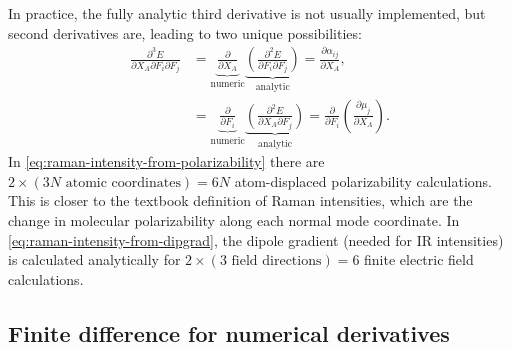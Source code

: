 \documentclass[%
class = book,%
crop = false,%
float = true,%
multi = true,%
preview = false,%
]{standalone}
\let\cite\autocite
\begin{document}
In practice, the fully analytic third derivative is not usually implemented, but second derivatives are, leading to two unique possibilities:
\begin{align}
  \label{eq:raman-intensity-from-polarizability}
  \frac{\partial^{3} E}{\partial X_{A} \partial F_{i} \partial F_{j}} &= \underbrace{\frac{\partial}{\partial X_{A}}}_{\text{numeric}} \underbrace{\left(\frac{\partial^{2} E}{\partial F_{i} \partial F_{j}}\right)}_{\text{analytic}} = \frac{\partial \alpha_{ij}}{\partial X_{A}}, \\
  \label{eq:raman-intensity-from-dipgrad}
  &= \underbrace{\frac{\partial}{\partial F_{i}}}_{\text{numeric}} \underbrace{\left(\frac{\partial^{2} E}{\partial X_{A} \partial F_{j}}\right)}_{\text{analytic}} = \frac{\partial}{\partial F_{i}} \left( \frac{\partial \mu_{j}}{\partial X_{A}} \right).
\end{align}
In \eqref{eq:raman-intensity-from-polarizability} there are \(2 \times (3N \,\,\text{atomic coordinates}) = 6N\) atom-displaced polarizability calculations. This is closer to the textbook definition of Raman intensities, which are the change in molecular polarizability along each normal mode coordinate\cite{TODO}. In \eqref{eq:raman-intensity-from-dipgrad}, the dipole gradient (needed for IR intensities) is calculated analytically for \(2 \times (3 \,\,\text{field directions}) = 6\) finite electric field calculations.

\subsection{Finite difference for numerical derivatives}
\label{ssec:finite-difference-for-numerical-derivatives}
\end{document}
